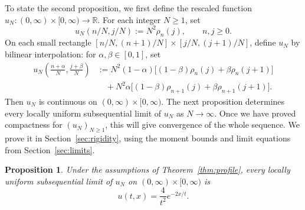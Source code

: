 \documentclass[11pt,letterpaper,reqno]{amsart}
\numberwithin{equation}{section}
\theoremstyle{plain}
\newtheorem{proposition}[theorem]{Proposition}
\theoremstyle{remark}
\begin{document}
To state the second proposition, we first define the rescaled function $u_N: (0,\infty)\times
[0,\infty) \to \mathbb{R}$. For each integer $N\ge1$, set
\begin{equation}\label{eq:rescaled}
 u_N(n/N,j/N) := N^2\rho_n(j),\qquad n,j\ge0.
\end{equation}
On each small rectangle $[n/N,(n+1)/N]\times[j/N,(j+1)/N]$, define $u_N$ by bilinear interpolation: for $\alpha,\beta\in[0,1]$, set
\begin{equation}\label{eq:uN}
 \begin{split}
 u_N\left(\frac{n+\alpha}{N},\frac{j+\beta}{N}\right)
 &:=N^2(1-\alpha)\bigl[(1-\beta)\rho_n(j)+\beta\rho_n(j+1)\bigr]\\
 &\quad+N^2\alpha\bigl[(1-\beta)\rho_{n+1}(j)+\beta\rho_{n+1}(j+1)\bigr].
 \end{split}
\end{equation}
Then $u_N$ is continuous on $(0,\infty)\times
[0,\infty)$. 
The next proposition determines every locally uniform subsequential limit of $u_N$ as $N\to\infty$. Once we have proved compactness for $(u_N)_{N\ge 1}$, this will give convergence of the whole sequence. We prove it in Section~\ref{sec:rigidity}, using the moment bounds and limit equations from Section~\ref{sec:limits}.

\begin{proposition}\label{prop:identification}
Under the assumptions of Theorem~\ref{thm:profile}, every locally uniform subsequential limit of $u_N$ on $(0,\infty)\times[0,\infty)$ is
\begin{equation}\label{eq:identifiedprofile}
 u(t,x)=\frac4{t^2}e^{-2x/t}.
\end{equation}
\end{proposition}
\end{document}

